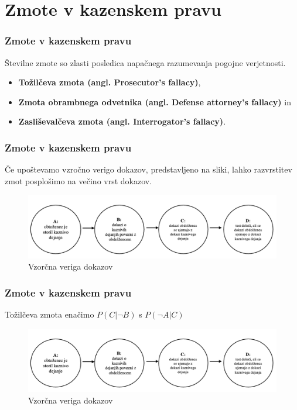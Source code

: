 \documentclass{beamer}
\begin{document}
\section{Zmote v kazenskem pravu}
\begin{frame}
    \frametitle{Zmote v kazenskem pravu}
  Številne zmote so zlasti posledica napačnega razumevanja pogojne verjetnosti.
  \begin{itemize}
    \item \textbf{Tožilčeva zmota (angl. Prosecutor’s fallacy)},
    \item \textbf{Zmota obrambnega odvetnika (angl. Defense attorney's fallacy)} in 
    \item \textbf{Zasliševalčeva zmota (angl. Interrogator’s fallacy)}. \vspace{3mm}
  \end{itemize}
\end{frame}

\begin{frame}
    \frametitle{Zmote v kazenskem pravu}
    Če upoštevamo vzročno verigo dokazov, predstavljeno na sliki, lahko razvrstitev zmot posplošimo na večino vrst dokazov. 
    \begin{figure}[!ht]\label{fig:slika_3}
        \centering
        \includegraphics[scale=0.50]{slika_3.png}
        \caption{Vzorčna veriga dokazov}
    \end{figure}
\end{frame}

\begin{frame}
    \frametitle{Zmote v kazenskem pravu}
    \begin{block}{Tožilčeva zmota}
        enačimo $P(C \lvert \neg B)$ s $P(\neg A \lvert C)$
    \end{block}
    \begin{figure}[!ht]\label{fig:slika_3}
        \centering
        \includegraphics[scale=0.50]{slika_3.png}
        \caption{Vzorčna veriga dokazov}
    \end{figure}
\end{frame}
\end{document}
